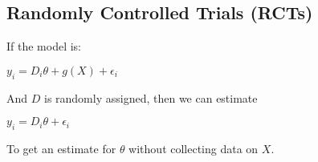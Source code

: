 
\subsection{Randomly Controlled Trials (RCTs)}

If the model is:

\(y_i=D_i\theta +g(X) +\epsilon_i\)

And \(D\) is randomly assigned, then we can estimate

\(y_i=D_i\theta +\epsilon_i\)

To get an estimate for \(\theta \) without collecting data on \(X\).


